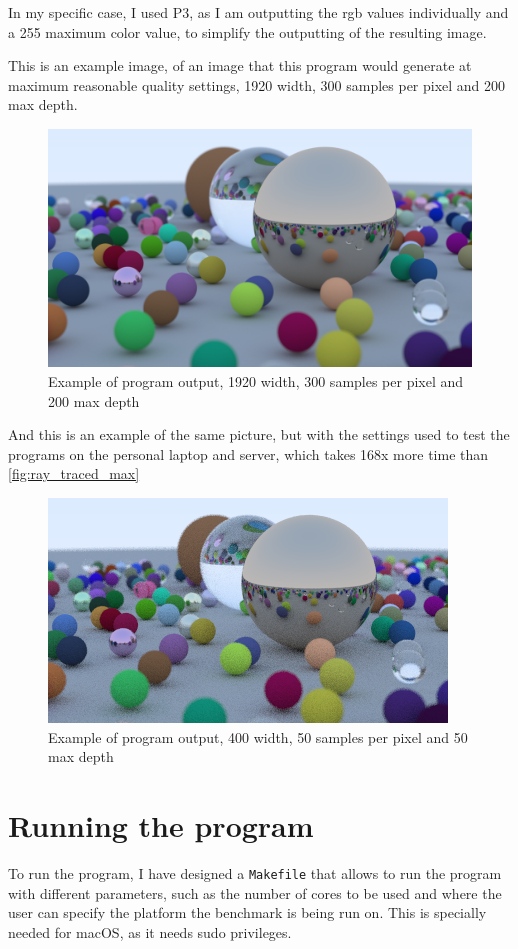 In my specific case, I used P3, as I am outputting the \gls{rgb} values individually and a 255 maximum color value, to simplify the outputting of the resulting image.

This is an example image, of an image that this program would generate at maximum reasonable quality settings, 1920 width, 300 samples per pixel and 200 max depth.

\begin{figure}[h]
    \centering
    \includegraphics[width=0.65\linewidth]{img/ray_traced_balls.png}
    \caption{Example of program output, 1920 width, 300 samples per pixel and 200 max depth}
    \label{fig:ray_traced_max}
\end{figure}

And this is an example of the same picture, but with the settings used to test the programs on the personal laptop and server, which takes 168x more time than \autoref{fig:ray_traced_max}

\begin{figure}[h]
    \centering
    \includegraphics[width=0.65\linewidth]{img/regular_spheres_output.png}
    \caption{Example of program output, 400 width, 50 samples per pixel and 50 max depth}
    \label{fig:ray_traced_average}
\end{figure}

\section{Running the program}
\label{sec:running_program}
To run the program, I have designed a \texttt{Makefile} that allows to run the program with different parameters, such as the number of cores to be used and where the user can specify the platform the benchmark is being run on. This is specially needed for macOS, as it needs \gls{sudo} privileges.

